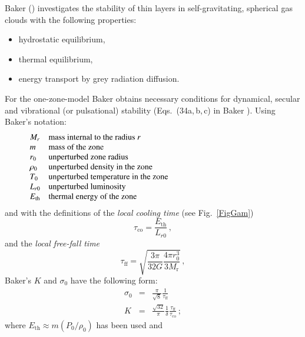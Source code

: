 \documentclass{layout}
\begin{document}
   Baker (\cite{baker}) investigates the stability of thin layers in
   self-gravitating,
   spherical gas clouds with the following properties:
   \begin{itemize}
      \item hydrostatic equilibrium,
      \item thermal equilibrium,
      \item energy transport by grey radiation diffusion.
   \end{itemize}
   For the one-zone-model Baker obtains necessary conditions
   for dynamical, secular and vibrational (or pulsational)
   stability (Eqs.\ (34a,\,b,\,c) in Baker \cite{baker}). Using Baker's
   notation:
   \[
      \begin{array}{lp{0.8\linewidth}}
         M_{r}  & mass internal to the radius $r$     \\
         m               & mass of the zone                    \\
         r_0             & unperturbed zone radius             \\
         \rho_0          & unperturbed density in the zone     \\
         T_0             & unperturbed temperature in the zone \\
         L_{r0}          & unperturbed luminosity              \\
         E_{\mathrm{th}} & thermal energy of the zone
      \end{array}
   \]
\noindent
   and with the definitions of the \emph{local cooling time\/}
   (see Fig.~\ref{FigGam})
   \begin{equation}
      \tau_{\mathrm{co}} = \frac{E_{\mathrm{th}}}{L_{r0}} \,,
   \end{equation}
   and the \emph{local free-fall time}
   \begin{equation}
      \tau_{\mathrm{ff}} =
         \sqrt{ \frac{3 \pi}{32 G} \frac{4\pi r_0^3}{3 M_{\mathrm{r}}}
}\,,
   \end{equation}
   Baker's $K$ and $\sigma_0$ have the following form:
   \begin{eqnarray}
      \sigma_0 & = & \frac{\pi}{\sqrt{8}}
                     \frac{1}{ \tau_{\mathrm{ff}}} \\
      K        & = & \frac{\sqrt{32}}{\pi} \frac{1}{\delta}
                        \frac{ \tau_{\mathrm{ff}} }
                             { \tau_{\mathrm{co}} }\,;
   \end{eqnarray}
   where $ E_{\mathrm{th}} \approx m (P_0/{\rho_0})$ has been used and
\end{document}
